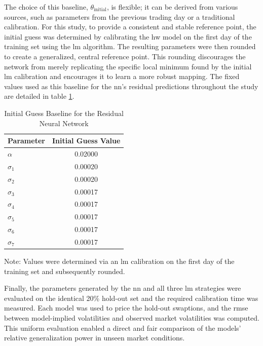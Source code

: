 The choice of this baseline, $\theta_{\text{initial}}$, is flexible; it can be derived from various sources, such as parameters from the previous trading day or a traditional calibration. For this study, to provide a consistent and stable reference point, the initial guess was determined by calibrating the \ac{hw} model on the first day of the training set using the \ac{lm} algorithm. The resulting parameters were then rounded to create a generalized, central reference point. This rounding discourages the network from merely replicating the specific local minimum found by the initial \ac{lm} calibration and encourages it to learn a more robust mapping. The fixed values used as this baseline for the \ac{nn}'s residual predictions throughout the study are detailed in table \ref{tab:nn_initial_guess}.

\begin{table}[H]
	\centering
	\begin{threeparttable}
		\caption{Initial Guess Baseline for the Residual Neural Network}
		\label{tab:nn_initial_guess}
		\begin{tabular}{l c}
			\toprule
			Parameter  & Initial Guess Value \\
			\midrule
			$\alpha$   & 0.02000             \\
			\addlinespace
			$\sigma_1$ & 0.00020             \\
			$\sigma_2$ & 0.00020             \\
			$\sigma_3$ & 0.00017             \\
			$\sigma_4$ & 0.00017             \\
			$\sigma_5$ & 0.00017             \\
			$\sigma_6$ & 0.00017             \\
			$\sigma_7$ & 0.00017             \\
			\bottomrule
		\end{tabular}
		\begin{tablenotes}
			\item \footnotesize Note: Values were determined via an \ac{lm} calibration on the first day of the training set and subsequently rounded.
		\end{tablenotes}
	\end{threeparttable}
\end{table}

Finally, the parameters generated by the \ac{nn} and all three \ac{lm} strategies were evaluated on the identical 20\% hold-out set and the required calibration time was measured. Each model was used to price the hold-out swaptions, and the \ac{rmse} between model-implied volatilities and observed market volatilities was computed. This uniform evaluation enabled a direct and fair comparison of the models' relative generalization power in unseen market conditions.

